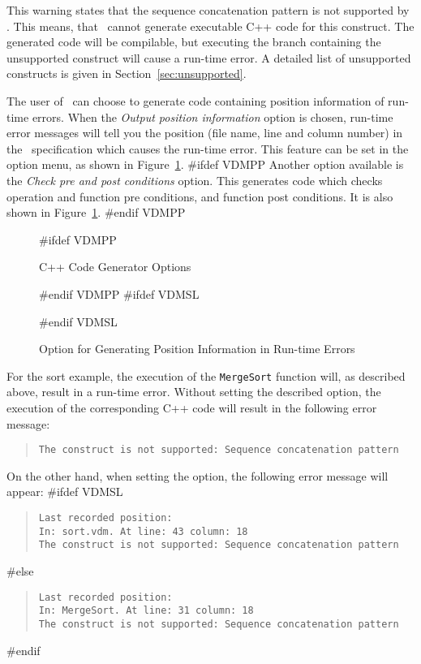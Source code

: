\documentclass[\pformat,12pt]{article}
\begin{document}
This warning states that the sequence concatenation pattern is not
supported by \tcg{}. This means, that \tcg\ cannot generate executable
C++ code for this construct.  The generated code will be compilable,
but executing the branch containing the unsupported construct will
cause a run-time error. A detailed list of unsupported constructs is
given in Section~\ref{sec:unsupported}.

The user of \tcg\ can choose to generate code containing position
information of run-time errors.  When the {\em Output position
  information} option is chosen, run-time error messages will
tell you the position (file name, line and column number) in the \VDM\ 
specification which causes the run-time error. This feature can be
  set in the option menu, as shown in Figure~\ref{fig:option}.
#ifdef VDMPP
Another option available is the \textit{Check pre and post conditions}
option. This generates code which checks operation
and function pre conditions, and function post conditions. It is also
shown in Figure~\ref{fig:option}.
#endif VDMPP

\begin{figure}[tbh]
\begin{center}
\mbox{}
#ifdef VDMPP
\caption{C++ Code Generator Options}\label{fig:option}
#endif VDMPP
#ifdef VDMSL
\caption{Option for Generating Position Information in Run-time Errors}\label{fig:option}
#endif VDMSL
\end{center}
\end{figure}
  
For the sort example, the execution of the \texttt{MergeSort} function will,
as described above, result in a run-time error.  Without setting the described 
option, the execution of the corresponding C++ code
will result in the following error message:
\begin{quote}
\begin{verbatim}
The construct is not supported: Sequence concatenation pattern
\end{verbatim}
\end{quote}
On the other hand, when setting the option, the following error message will appear:
#ifdef VDMSL
\begin{quote}
\begin{verbatim}
Last recorded position:
In: sort.vdm. At line: 43 column: 18
The construct is not supported: Sequence concatenation pattern
\end{verbatim}
\end{quote}
#else
\begin{quote}
\begin{verbatim}
Last recorded position:
In: MergeSort. At line: 31 column: 18
The construct is not supported: Sequence concatenation pattern
\end{verbatim}
\end{quote}
#endif
\end{document}
